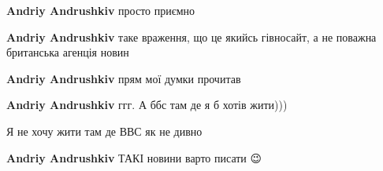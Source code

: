 \begin{itemize}
\begin{itemize}
\end{itemize}

 
\textbf{Andriy Andrushkiv} просто приємно

 
\textbf{Andriy Andrushkiv} таке враження, що це якийсь гівносайт, а не поважна британська агенція новин

 
\textbf{Andriy Andrushkiv} прям мої думки прочитав \Smiley[1.0][yellow]

 
\textbf{Andriy Andrushkiv} ггг. А ббс там де я б хотів жити)))

 
Я не хочу жити там де ВВС як не дивно

 
\textbf{Andriy Andrushkiv} ТАКІ новини варто писати 😉

 

\end{itemize}

